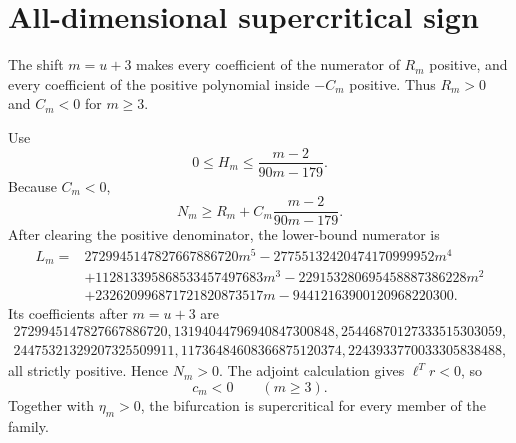 \section*{All-dimensional supercritical sign}
The shift $m=u+3$ makes every coefficient of the numerator of $R_m$ positive,
and every coefficient of the positive polynomial inside $-C_m$ positive.
Thus $R_m>0$ and $C_m<0$ for $m\ge3$.

Use
\[
0\le H_m\le\frac{m-2}{90m-179}.
\]
Because $C_m<0$,
\[
N_m\ge R_m+C_m\frac{m-2}{90m-179}.
\]
After clearing the positive denominator, the lower-bound numerator is
\[
\begin{aligned}
L_m={}&2729945147827667886720m^5
-27755132420474170999952m^4\\
&+112813395868533457497683m^3
-229153280695458887386228m^2\\
&+232620996871721820873517m
-94412163900120968220300.
\end{aligned}
\]
Its coefficients after $m=u+3$ are
\[
\begin{gathered}
2729945147827667886720,
13194044796940847300848,
25446870127333515303059,\\
24475321329207325509911,
11736484608366875120374,
2243933770033305838488,
\end{gathered}
\]
all strictly positive.  Hence $N_m>0$.  The adjoint calculation gives
$\ell^Tr<0$, so
\[
\boxed{c_m<0\qquad(m\ge3).}
\]
Together with $\eta_m>0$, the bifurcation is supercritical for every member of
the family.
